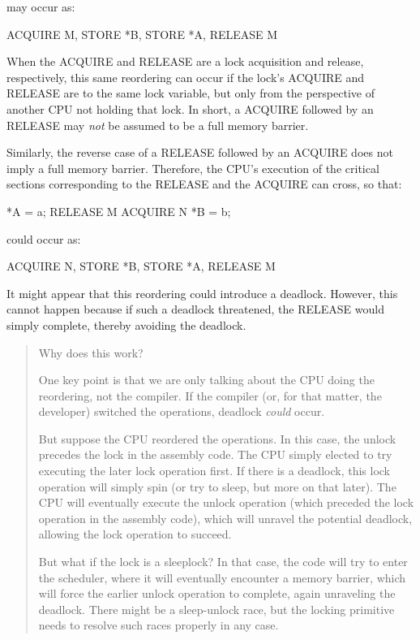 \noindent%
may occur as:

\begin{VerbatimU}
	ACQUIRE M, STORE *B, STORE *A, RELEASE M
\end{VerbatimU}

When the ACQUIRE and RELEASE are a lock acquisition and release,
respectively, this same reordering can occur if the lock's ACQUIRE and
RELEASE are to the same lock variable, but only from the perspective of
another CPU not holding that lock.
In short, a ACQUIRE followed by an RELEASE may \emph{not} be assumed to
be a full memory barrier.

Similarly, the reverse case of a RELEASE followed by an ACQUIRE does
not imply a full memory barrier.
Therefore, the CPU's execution of the critical sections corresponding
to the RELEASE and the ACQUIRE can cross, so that:

\begin{VerbatimU}
	*A = a;
	RELEASE M
	ACQUIRE N
	*B = b;
\end{VerbatimU}

\noindent%
could occur as:

\begin{VerbatimU}
	ACQUIRE N, STORE *B, STORE *A, RELEASE M
\end{VerbatimU}

It might appear that this reordering could introduce a deadlock.
However, this cannot happen because if such a deadlock threatened,
the RELEASE would simply complete, thereby avoiding the deadlock.

\begin{quote}
	Why does this work?

	One key point is that we are only talking about the CPU doing
	the reordering, not the compiler.
	If the compiler (or, for that matter, the developer) switched
	the operations, deadlock \emph{could} occur.

	But suppose the CPU reordered the operations.
	In this case, the unlock precedes the lock in the assembly code.
	The CPU simply elected to try executing the later lock operation
	first.
	If there is a deadlock, this lock operation will simply spin (or
	try to sleep, but more on that later).
	The CPU will eventually execute the unlock operation (which
	preceded the lock operation in the assembly code), which will
	unravel the potential deadlock, allowing the lock operation to
	succeed.

	But what if the lock is a sleeplock?
	In that case, the code will try to enter the scheduler, where it
	will eventually encounter a memory barrier, which will force the
	earlier unlock operation to complete, again unraveling the deadlock.
	There might be a sleep-unlock race, but the locking primitive
	needs to resolve such races properly in any case.

\end{quote}

